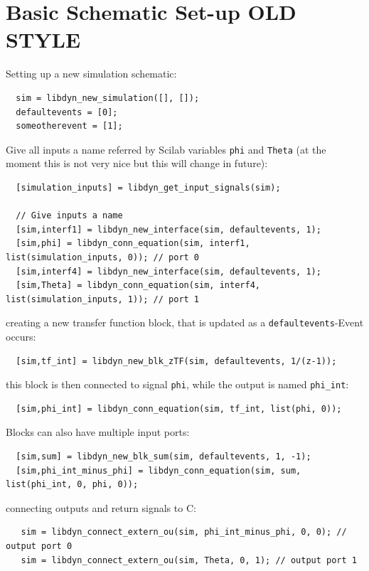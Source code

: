 \documentclass[%
	pdftex,%
	a4paper,%
	oneside,%
	11pt,%
	halfparskip,%
	headsepline,%
	bibtotocnumbered,%
	idxtotoc%
]{scrartcl}
\begin{document}
\section{Basic Schematic Set-up OLD STYLE}

Setting up a new simulation schematic:

\begin{verbatim}
  sim = libdyn_new_simulation([], []);
  defaultevents = [0];
  someotherevent = [1]; 
\end{verbatim}

Give all inputs a name referred by Scilab variables \texttt{phi} and \texttt{Theta} (at the moment this is not very nice but this will change in future):

\begin{verbatim}
  [simulation_inputs] = libdyn_get_input_signals(sim);
  
  // Give inputs a name
  [sim,interf1] = libdyn_new_interface(sim, defaultevents, 1);
  [sim,phi] = libdyn_conn_equation(sim, interf1, list(simulation_inputs, 0)); // port 0
  [sim,interf4] = libdyn_new_interface(sim, defaultevents, 1);
  [sim,Theta] = libdyn_conn_equation(sim, interf4, list(simulation_inputs, 1)); // port 1
\end{verbatim}

creating a new transfer function block, that is updated as a \texttt{defaultevents}-Event occurs:

\begin{verbatim}  
  [sim,tf_int] = libdyn_new_blk_zTF(sim, defaultevents, 1/(z-1));
\end{verbatim}

this block is then connected to signal \texttt{phi}, while the output is named \texttt{phi\_int}:

\begin{verbatim}
  [sim,phi_int] = libdyn_conn_equation(sim, tf_int, list(phi, 0));
\end{verbatim}

Blocks can also have multiple input ports:

\begin{verbatim}
  [sim,sum] = libdyn_new_blk_sum(sim, defaultevents, 1, -1);
  [sim,phi_int_minus_phi] = libdyn_conn_equation(sim, sum, list(phi_int, 0, phi, 0));
\end{verbatim}

connecting outputs and return signals to C:

\begin{verbatim}
   sim = libdyn_connect_extern_ou(sim, phi_int_minus_phi, 0, 0); // output port 0
   sim = libdyn_connect_extern_ou(sim, Theta, 0, 1); // output port 1
\end{verbatim}
\end{document}
